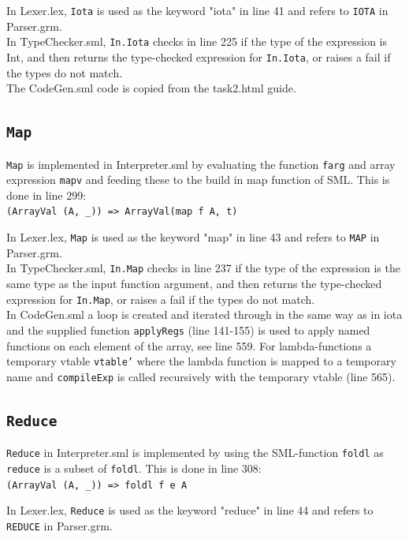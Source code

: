 \documentclass[11pt,a4paper]{article}
\theoremstyle{plain}
\theoremstyle{definition}
\theoremstyle{remark}
\numberwithin{equation}{section}
\begin{document}
	In Lexer.lex, \texttt{Iota} is used as the keyword "iota" in line 41 and refers to \texttt{IOTA} in Parser.grm.\\
	
	In TypeChecker.sml, \texttt{In.Iota} checks in line 225 if the type of the expression is Int, and then returns the type-checked expression for \texttt{In.Iota}, or raises a fail if the types do not match.\\
	
	The CodeGen.sml code is copied from the task2.html guide. 
	
	
	\subsection{\texttt{Map}}
	\texttt{Map} is implemented in Interpreter.sml by evaluating the function \texttt{farg} and array expression \texttt{mapv} and feeding these to the build in map function of SML. This is done in line 299:\\
	\texttt{(ArrayVal (A, \_)) => ArrayVal(map f A, t)}
	
	In Lexer.lex, \texttt{Map} is used as the keyword "map" in line 43 and refers to \texttt{MAP} in Parser.grm.\\
	
	In TypeChecker.sml, \texttt{In.Map} checks in line 237 if the type of the expression is the same type as the input function argument, and then returns the type-checked expression for \texttt{In.Map}, or raises a fail if the types do not match.\\
	
	In CodeGen.sml a loop is created and iterated through in the same way as in iota and the supplied function \texttt{applyRegs} (line 141-155) is used to apply named functions on each element of the array, see line 559. For lambda-functions a temporary vtable \texttt{vtable'} where the lambda function is mapped to a temporary name and \texttt{compileExp} is called recursively with the temporary vtable (line 565).
	
	
	\subsection{\texttt{Reduce}}
	\texttt{Reduce} in Interpreter.sml is implemented by using the SML-function \texttt{foldl} as \texttt{reduce} is a subset of \texttt{foldl}. This is done in line 308:\\ 
	\texttt{(ArrayVal (A, \_)) => foldl f e A}
	
	In Lexer.lex, \texttt{Reduce} is used as the keyword "reduce" in line 44 and refers to \texttt{REDUCE} in Parser.grm.\\
	
\end{document}
